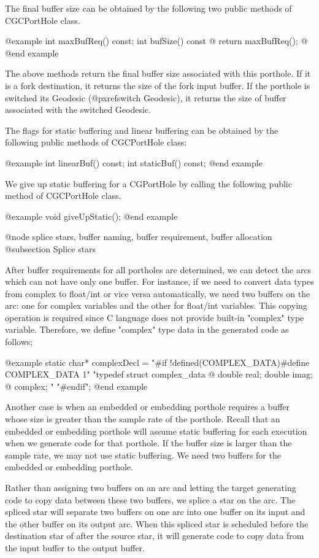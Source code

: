 {The final buffer size can be obtained by the following two public methods
of CGCPortHole class.

@example
int maxBufReq() const;
int bufSize() const @{ return maxBufReq(); @}
@end example

The above methods return the final buffer size associated with this porthole.
If it is a fork destination, it returns the size of the fork input buffer.
If the porthole is switched its Geodesic (@pxref{switch Geodesic}), it returns
the size of buffer associated with the switched Geodesic.

The flags for static buffering and linear buffering can be obtained by
the following public methods of CGCPortHole class:

@example
int linearBuf() const;
int staticBuf() const;
@end example

We give up static buffering for a CGPortHole by calling the following public
method of CGCPortHole class.

@example
void giveUpStatic();
@end example

@node splice stars, buffer naming, buffer requirement, buffer allocation
@subsection Splice stars

After buffer requirements for all portholes are determined, we can detect
the arcs which can not have only one buffer. For instance, if we need
to convert data types from complex to float/int or vice versa automatically,
we need two buffers on the arc: one for complex variables and the other
for float/int variables. This copying operation is required since C language
does not provide built-in "complex" type variable. Therefore, we define
"complex" type data in the generated code as follows;

@example
static char* complexDecl =
"\n#if !defined(COMPLEX_DATA)\n#define COMPLEX_DATA 1"
"\n typedef struct complex_data @{ double real; double imag; @} complex; \n"
"#endif\n";
@end example

Another case is when an embedded or embedding porthole requires a buffer
whose size is greater than the sample rate of the porthole. Recall that
an embedded or embedding porthole will assume static buffering for
each execution when we generate code for that porthole. If the buffer 
size is larger than the sample rate, we may not use static buffering. 
We need two buffers for the embedded or embedding porthole.

Rather than assigning two buffers on an arc and letting the target
generating code to copy data between these two buffers, we splice
a star on the arc. The spliced star will separate two buffers on one arc
into one buffer on its input and the other buffer on its output arc.
When this spliced star is scheduled before the destination star of after
the source star,
it will generate code to copy data from the input buffer to the output buffer.

}
